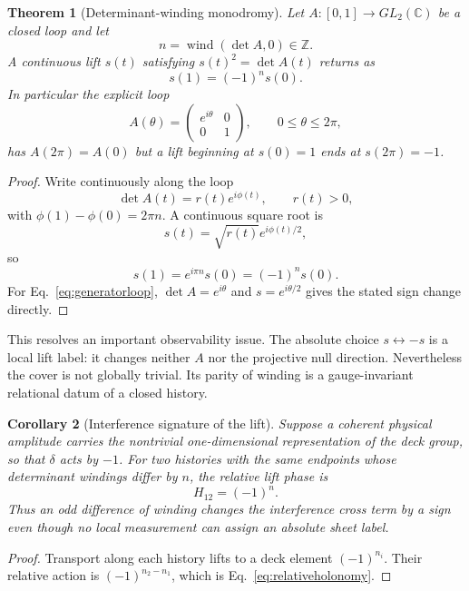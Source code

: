 \documentclass[11pt]{article}
\newtheorem{theorem}{Theorem}[section]
\newtheorem{corollary}[theorem]{Corollary}
\theoremstyle{definition}\newtheorem{definition}[theorem]{Definition}
\theoremstyle{remark}\newtheorem{remark}[theorem]{Remark}\newtheorem{conjecture}[theorem]{Conjecture}
\begin{document}
\begin{theorem}[Determinant-winding monodromy]\label{thm:detmonodromy}
Let $A:[0,1]\to GL_2(\mathbb C)$ be a closed loop and let
\begin{equation}
 n=\operatorname{wind}(\det A,0)\in\mathbb Z.
\end{equation}
A continuous lift $s(t)$ satisfying $s(t)^2=\det A(t)$ returns as
\begin{equation}\label{eq:monodromysign}
 \boxed{s(1)=(-1)^n s(0).}
\end{equation}
In particular the explicit loop
\begin{equation}\label{eq:generatorloop}
 A(\theta)=\begin{pmatrix}e^{i\theta}&0\\0&1\end{pmatrix},
 \qquad 0\le\theta\le2\pi,
\end{equation}
has $A(2\pi)=A(0)$ but a lift beginning at $s(0)=1$ ends at $s(2\pi)=-1$.
\end{theorem}
\begin{proof}
Write continuously along the loop
\begin{equation}
 \det A(t)=r(t)e^{i\phi(t)},\qquad r(t)>0,
\end{equation}
with $\phi(1)-\phi(0)=2\pi n$. A continuous square root is
\begin{equation}
 s(t)=\sqrt{r(t)}e^{i\phi(t)/2},
\end{equation}
so
\begin{equation}
 s(1)=e^{i\pi n}s(0)=(-1)^n s(0).
\end{equation}
For Eq.~\eqref{eq:generatorloop}, $\det A=e^{i\theta}$ and $s=e^{i\theta/2}$ gives the stated sign change directly.
\end{proof}

This resolves an important observability issue. The absolute choice $s\leftrightarrow-s$ is a local lift label: it changes neither $A$ nor the projective null direction. Nevertheless the cover is not globally trivial. Its parity of winding is a gauge-invariant relational datum of a closed history.

\begin{corollary}[Interference signature of the lift]\label{cor:liftinterference}
Suppose a coherent physical amplitude carries the nontrivial one-dimensional representation of the deck group, so that $\delta$ acts by $-1$. For two histories with the same endpoints whose determinant windings differ by $n$, the relative lift phase is
\begin{equation}\label{eq:relativeholonomy}
 \boxed{H_{12}=(-1)^n.}
\end{equation}
Thus an odd difference of winding changes the interference cross term by a sign even though no local measurement can assign an absolute sheet label.
\end{corollary}
\begin{proof}
Transport along each history lifts to a deck element $(-1)^{n_i}$. Their relative action is $(-1)^{n_2-n_1}$, which is Eq.~\eqref{eq:relativeholonomy}.
\end{proof}
\end{document}
